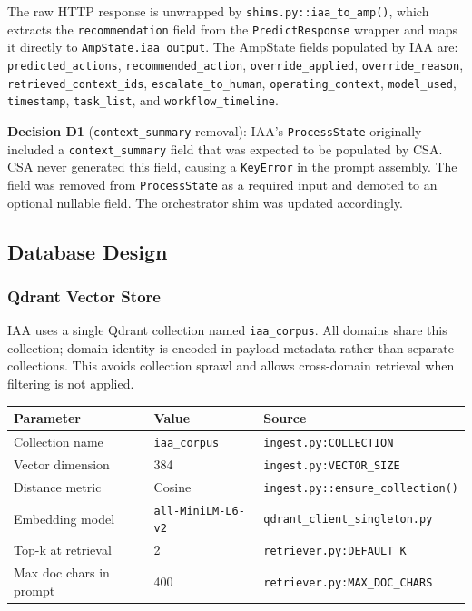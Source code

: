 \documentclass[12pt,a4paper]{article}
\begin{document}
The raw HTTP response is unwrapped by \texttt{shims.py::iaa\_to\_amp()}, which extracts
the \texttt{recommendation} field from the \texttt{PredictResponse} wrapper and maps it
directly to \texttt{AmpState.iaa\_output}. The AmpState fields populated by IAA are:
\texttt{predicted\_actions}, \texttt{recommended\_action}, \texttt{override\_applied},
\texttt{override\_reason}, \texttt{retrieved\_context\_ids}, \texttt{escalate\_to\_human},
\texttt{operating\_context}, \texttt{model\_used}, \texttt{timestamp}, \texttt{task\_list},
and \texttt{workflow\_timeline}.

\textbf{Decision D1} (\texttt{context\_summary} removal): IAA's \texttt{ProcessState}
originally included a \texttt{context\_summary} field that was expected to be populated by
CSA. CSA never generated this field, causing a \texttt{KeyError} in the prompt assembly.
The field was removed from \texttt{ProcessState} as a required input and demoted to an
optional nullable field. The orchestrator shim was updated accordingly.

\subsection{Database Design}

\subsubsection{Qdrant Vector Store}

IAA uses a single Qdrant collection named \texttt{iaa\_corpus}. All domains share this
collection; domain identity is encoded in payload metadata rather than separate collections.
This avoids collection sprawl and allows cross-domain retrieval when filtering is not applied.

\begin{center}
\begin{tabular}{@{}lll@{}}
\toprule
\textbf{Parameter} & \textbf{Value} & \textbf{Source} \\
\midrule
Collection name & \texttt{iaa\_corpus} & \texttt{ingest.py:COLLECTION} \\
Vector dimension & 384 & \texttt{ingest.py:VECTOR\_SIZE} \\
Distance metric & Cosine & \texttt{ingest.py::ensure\_collection()} \\
Embedding model & \texttt{all-MiniLM-L6-v2} & \texttt{qdrant\_client\_singleton.py} \\
Top-k at retrieval & 2 & \texttt{retriever.py:DEFAULT\_K} \\
Max doc chars in prompt & 400 & \texttt{retriever.py:MAX\_DOC\_CHARS} \\
\bottomrule
\end{tabular}
\end{center}
\end{document}
